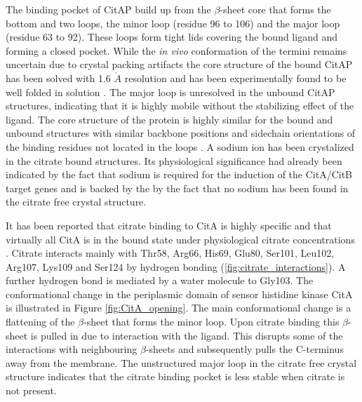 \documentclass[english, a4paper, 12pt, titlepage, draft]{article}
\begin{document}
The binding pocket of CitAP build up from the $\beta$-sheet core that forms the bottom and two loops, the minor loop (residue 96 to 106) and the major loop (residue 63 to 92).
These loops form tight lids covering the bound ligand and forming a closed pocket.
While the \textit{in vivo} conformation of the termini remains uncertain due to crystal packing artifacts the core structure of the bound CitAP has been solved with 1.6 $\mathring{A}$ resolution and has been experimentally found to be well folded in solution \cite{CitA_2J80}.
The major loop is unresolved in the unbound CitAP structures, indicating that it is highly mobile without the stabilizing effect of the ligand.
The core structure of the protein is highly similar for the bound and unbound structures with similar backbone positions and sidechain orientations of the binding residues not located in the loops \cite{CitA_2J80}.
A sodium ion has been crystalized in the citrate bound structures.
Its physiological significance had already been indicated by the fact that sodium is required for the induction of the CitA/CitB target genes \cite{KlebsiellaMetabolism} and is backed by the by the fact that no sodium has been found in the citrate free crystal structure.

It has been reported that citrate binding to CitA is highly specific and that virtually all CitA is in the bound state under physiological citrate concentrations \cite{CitA_2J80}.
Citrate interacts mainly with Thr58, Arg66, His69, Glu80, Ser101, Leu102, Arg107, Lys109 and Ser124 by hydrogen bonding (\ref{fig:citrate_interactions}).
A further hydrogen bond is mediated by a water molecule to Gly103.
The conformational change in the periplasmic domain of sensor histidine kinase CitA is illustrated in Figure \ref{fig:CitA_opening}.
The main conformational change is a flattening of the $\beta$-sheet that forms the minor loop.
Upon citrate binding this $\beta$-sheet is pulled in due to interaction with the ligand.
This disrupts some of the interactions with neighbouring $\beta$-sheets and subsequently pulls the C-terminus away from the membrane.
The unstructured major loop in the citrate free crystal structure indicates that the citrate binding pocket is less stable when citrate is not present.
\end{document}

